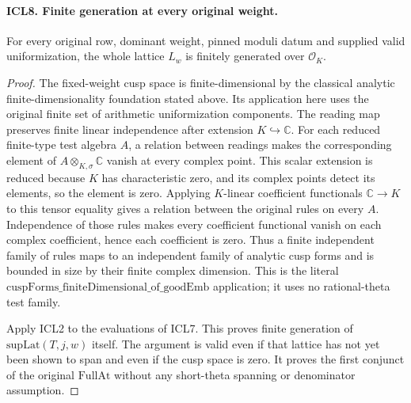\paragraph{ICL8. Finite generation at every original weight.}
\label{claim:ICL8}
For every original row, dominant weight, pinned moduli datum
and supplied valid uniformization, the whole lattice
\(L_w\) is finitely generated over \(\mathcal O_K\).
\begin{proof}
The fixed-weight cusp space is finite-dimensional by the
classical analytic finite-dimensionality foundation stated
above.  Its application here uses the original finite set
of arithmetic uniformization components.  The reading map
preserves finite linear independence after extension
\(K\hookrightarrow\mathbb C\).  For each reduced finite-type
test algebra \(A\), a relation between readings makes the
corresponding element of \(A\otimes_{K,\sigma}\mathbb C\)
vanish at every complex point.  This scalar extension is
reduced because \(K\) has characteristic zero, and its
complex points detect its elements, so the element is
zero.  Applying \(K\)-linear coefficient functionals
\(\mathbb C\to K\) to this tensor equality gives a
relation between the original rules on every \(A\).
Independence of those rules makes every coefficient
functional vanish on each complex coefficient, hence
each coefficient is zero.  Thus a finite
independent family of rules maps to an independent family
of analytic cusp forms and is bounded in size by their
finite complex dimension.  This is the literal
\(\mathrm{cuspForms\_finiteDimensional\_of\_goodEmb}\)
application; it uses no rational-theta test family.

Apply ICL2 to the evaluations of ICL7.  This proves finite
generation of \(\mathrm{supLat}(T,j,w)\) itself.  The
argument is valid even if that lattice has not yet been
shown to span and even if the cusp space is zero.  It proves
the first conjunct of the original \(\mathrm{FullAt}\)
without any short-theta spanning or denominator assumption.
\end{proof}

